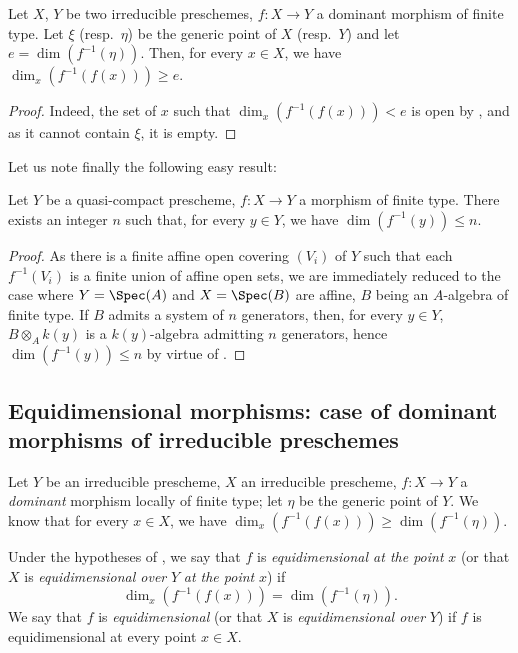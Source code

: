 \begin{corollary}[13.1.6]
\label{IV.13.1.6}
Let $X$, $Y$ be two irreducible preschemes, $f:X\to Y$ a dominant morphism of finite type.
Let $\xi$ (resp.\ $\eta$) be the generic point of $X$ (resp.\ $Y$) and let $e=\dim(f^{-1}(\eta))$.
Then, for every $x\in X$, we have $\dim_x(f^{-1}(f(x)))\geq e$.
\end{corollary}

\begin{proof}
Indeed, the set of $x$ such that $\dim_x(f^{-1}(f(x)))<e$ is open by , and as it cannot contain $\xi$, it is empty.
\end{proof}

Let us note finally the following easy result:

\begin{proposition}[13.1.7]
\label{IV.13.1.7}
Let $Y$ be a quasi-compact prescheme, $f:X\to Y$ a morphism of finite type.
There exists an integer $n$ such that, for every $y\in Y$, we have $\dim(f^{-1}(y))\leq n$.
\end{proposition}

\begin{proof}
As there is a finite affine open covering $(V_i)$ of $Y$ such that each $f^{-1}(V_i)$ is a finite union of affine open sets, we are immediately reduced to the case where $Y=\Spec(A)$ and $X=\Spec(B)$ are affine, $B$ being an $A$-algebra of finite type.
If $B$ admits a system of $n$ generators, then, for every $y\in Y$, $B\otimes_A k(y)$ is a $k(y)$-algebra admitting $n$ generators, hence $\dim(f^{-1}(y))\leq n$ by virtue of .
\end{proof}

\subsection{Equidimensional morphisms: case of dominant morphisms of irreducible preschemes}
\label{subsection:IV.13.2}

\begin{env}[13.2.1]
\label{IV.13.2.1}
Let $Y$ be an irreducible prescheme, $X$ an irreducible prescheme, $f:X\to Y$ a \emph{dominant} morphism locally of finite type; let $\eta$ be the generic point of $Y$.
We know  that for every $x\in X$, we have $\dim_x(f^{-1}(f(x)))\geq\dim(f^{-1}(\eta))$.
\end{env}

\begin{definition}[13.2.2]
\label{IV.13.2.2}
Under the hypotheses of , we say that $f$ is \emph{equidimensional at the point} $x$ (or that $X$ is \emph{equidimensional over} $Y$ \emph{at the point} $x$) if
\[
  \dim_x(f^{-1}(f(x)))=\dim(f^{-1}(\eta)).
\]
We say that $f$ is \emph{equidimensional} (or that $X$ is \emph{equidimensional over} $Y$) if $f$ is equidimensional at every point $x\in X$.
\end{definition}


